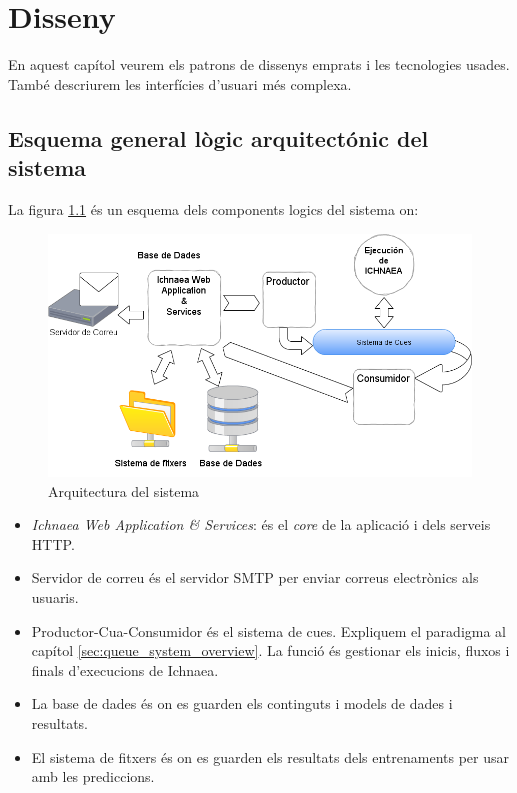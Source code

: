 \chapter{Disseny}
\label{cha:dessign}

En aquest cap\'{i}tol veurem els patrons de dissenys emprats i les tecnologies usades. Tamb\'{e} descriurem les interf\'{i}cies d'usuari m\'{e}s complexa.


\section{Esquema general l\`{o}gic arquitect\'{o}nic del sistema}
La figura \ref{fig:archsoftware} \'{e}s un esquema dels components logics del sistema on:

\begin{figure}[H]
  \includegraphics[scale=0.5]{img/design/ArchitectureSoftware.png}
  \caption{Arquitectura del sistema}
  \label{fig:archsoftware}
\end{figure}

\begin{itemize}
\item \textit{Ichnaea Web Application \& Services}: \'{e}s el \textit{core} de la aplicaci\'{o} i dels serveis HTTP.
\item Servidor de correu \'{e}s el servidor SMTP per enviar correus electr\`{o}nics als usuaris.
\item Productor-Cua-Consumidor \'{e}s el sistema de cues. Expliquem el paradigma al cap\'{i}tol \ref{sec:queue_system_overview}. La funci\'{o} \'{e}s gestionar els inicis, fluxos i finals d'execucions de Ichnaea.
\item La base de dades \'{e}s on es guarden els continguts i models de dades i resultats.
\item El sistema de fitxers \'{e}s on es guarden els resultats dels entrenaments per usar amb les prediccions.
\end{itemize}

